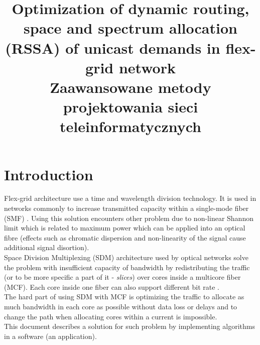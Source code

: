 \documentclass[conference]{IEEEtran}
\begin{document}
\title{Optimization of dynamic routing, space and spectrum allocation
(RSSA) of unicast demands in flex-grid network\\
{\footnotesize \textsuperscript{} Zaawansowane metody projektowania sieci teleinformatycznych}
}

\author{
\and
{}
}

\maketitle

\section{Introduction}
Flex-grid architecture use a time and wavelength division technology. It is used in networks commonly to increase transmitted capacity within a single-mode fiber (SMF) \cite{sdm-walko}. Using this solution encounters other problem due to non-linear Shannon limit which is related to maximum power which can be applied into an optical fibre (effects such as chromatic dispersion and non-linearity of the signal cause additional signal disortion)\cite{shannon}.
\\
Space Division Multiplexing (SDM) architecture used by optical networks solve the problem with insufficient capacity of bandwidth by redistributing the traffic (or to be more specific a part of it - \textit{slices}) over cores inside a multicore fiber (MCF). Each core inside one fiber can also support different bit rate \cite{flex-intro}.
\\
The hard part of using SDM with MCF is optimizing the traffic to allocate as much bandwidth in each core as possible without data loss or delays and to change the path when allocating cores within a current is impossible.
\\
This document describes a solution for such problem by implementing algorithms in a software (an application). 
\end{document}

